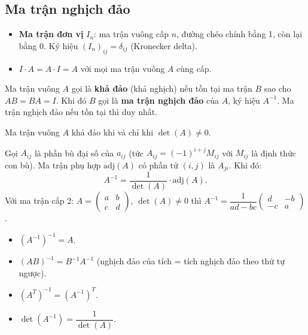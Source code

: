 \documentclass[12pt,a4paper]{article}
\begin{document}
\subsection{Ma trận nghịch đảo}

\begin{dinhnghia}
  \begin{itemize}
    \item \textbf{Ma trận đơn vị} $I_n$: ma trận vuông cấp $n$, đường chéo chính bằng 1, còn lại bằng 0. Ký hiệu $(I_n)_{ij} = \delta_{ij}$ (Kronecker delta).
    \item $I \cdot A = A \cdot I = A$ với mọi ma trận vuông $A$ cùng cấp.
  \end{itemize}
\end{dinhnghia}

\begin{dinhnghia}
  Ma trận vuông $A$ gọi là \textbf{khả đảo} (khả nghịch) nếu tồn tại ma trận $B$ sao cho $AB = BA = I$. Khi đó $B$ gọi là \textbf{ma trận nghịch đảo} của $A$, ký hiệu $A^{-1}$. Ma trận nghịch đảo nếu tồn tại thì duy nhất.
\end{dinhnghia}

\begin{dinhly}[title={Điều kiện khả đảo}]
  Ma trận vuông $A$ khả đảo khi và chỉ khi $\det(A) \ne 0$.
\end{dinhly}

\begin{congthuc}[title={Công thức nghịch đảo qua phụ đại số}]
  Gọi $A_{ij}$ là phần bù đại số của $a_{ij}$ (tức $A_{ij} = (-1)^{i+j} M_{ij}$ với $M_{ij}$ là định thức con bù). Ma trận phụ hợp $\mathrm{adj}(A)$ có phần tử $(i,j)$ là $A_{ji}$. Khi đó:
  \[
    A^{-1} = \frac{1}{\det(A)} \cdot \mathrm{adj}(A).
  \]
  Với ma trận cấp 2: $A = \begin{pmatrix} a & b \\ c & d \end{pmatrix}$, $\det(A) \ne 0$ thì
  $A^{-1} = \dfrac{1}{ad-bc} \begin{pmatrix} d & -b \\ -c & a \end{pmatrix}$.
\end{congthuc}

\begin{tinhchat}[title={Tính chất ma trận nghịch đảo}]
  \begin{itemize}
    \item $(A^{-1})^{-1} = A$.
    \item $(AB)^{-1} = B^{-1} A^{-1}$ (nghịch đảo của tích = tích nghịch đảo theo thứ tự ngược).
    \item $(A^T)^{-1} = (A^{-1})^T$.
    \item $\det(A^{-1}) = \dfrac{1}{\det(A)}$.
  \end{itemize}
\end{tinhchat}
\end{document}
